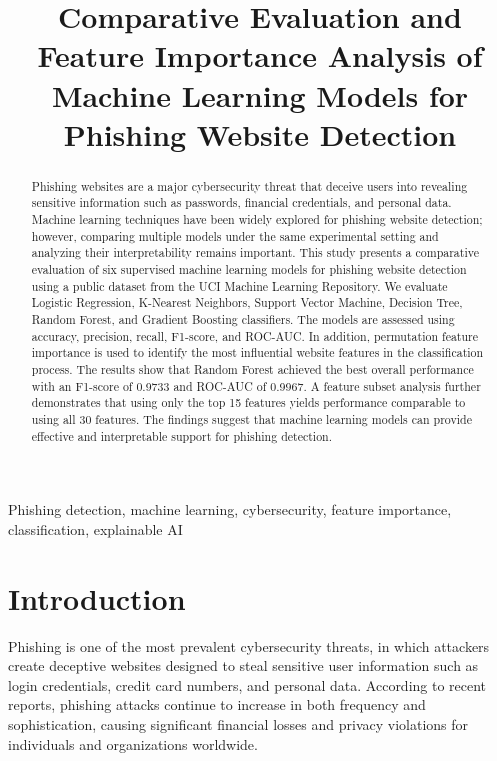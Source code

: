 \documentclass[conference]{IEEEtran}
\begin{document}
\title{Comparative Evaluation and Feature Importance Analysis of Machine Learning Models for Phishing Website Detection}

\author{
}

\maketitle

\begin{abstract}
Phishing websites are a major cybersecurity threat that deceive users into revealing sensitive information such as passwords, financial credentials, and personal data. Machine learning techniques have been widely explored for phishing website detection; however, comparing multiple models under the same experimental setting and analyzing their interpretability remains important. This study presents a comparative evaluation of six supervised machine learning models for phishing website detection using a public dataset from the UCI Machine Learning Repository. We evaluate Logistic Regression, K-Nearest Neighbors, Support Vector Machine, Decision Tree, Random Forest, and Gradient Boosting classifiers. The models are assessed using accuracy, precision, recall, F1-score, and ROC-AUC. In addition, permutation feature importance is used to identify the most influential website features in the classification process. The results show that Random Forest achieved the best overall performance with an F1-score of 0.9733 and ROC-AUC of 0.9967. A feature subset analysis further demonstrates that using only the top 15 features yields performance comparable to using all 30 features. The findings suggest that machine learning models can provide effective and interpretable support for phishing detection.
\end{abstract}

\begin{IEEEkeywords}
Phishing detection, machine learning, cybersecurity, feature importance, classification, explainable AI
\end{IEEEkeywords}

\section{Introduction}

Phishing is one of the most prevalent cybersecurity threats, in which attackers create deceptive websites designed to steal sensitive user information such as login credentials, credit card numbers, and personal data. According to recent reports, phishing attacks continue to increase in both frequency and sophistication, causing significant financial losses and privacy violations for individuals and organizations worldwide.
\end{document}
